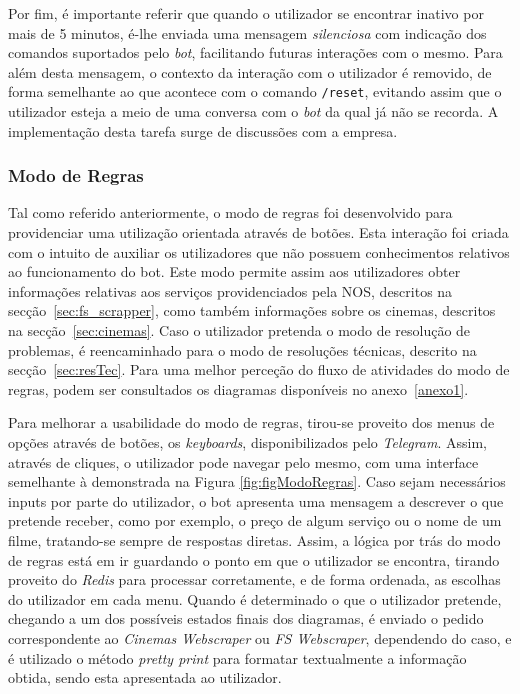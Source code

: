 \documentclass[11pt,a4paper]{article}
\begin{document}
Por fim, é importante referir que quando o utilizador se encontrar inativo por mais de 5 minutos, é-lhe
enviada uma mensagem \textit{silenciosa} com indicação dos comandos suportados pelo \textit{bot},
facilitando futuras interações com o mesmo. Para além desta mensagem, o contexto da interação com o
utilizador é removido, de forma semelhante ao que acontece com o comando \texttt{/reset}, evitando assim que
o utilizador esteja a meio de uma conversa com o \textit{bot} da qual já não se recorda. A implementação
desta tarefa surge de discussões com a empresa.

\subsubsection{Modo de Regras}\label{sec:modoregras}

Tal como referido anteriormente, o modo de regras foi desenvolvido para providenciar uma utilização
orientada através de botões. Esta interação foi criada com o intuito de auxiliar os utilizadores que não
possuem conhecimentos relativos ao funcionamento do bot. Este modo permite assim aos utilizadores obter
informações relativas aos serviços providenciados pela NOS, descritos na secção~\ref{sec:fs_scrapper}, como
também informações sobre os cinemas, descritos na secção~\ref{sec:cinemas}. Caso o utilizador pretenda o
modo de resolução de problemas, é reencaminhado para o modo de resoluções técnicas, descrito na
secção~\ref{sec:resTec}. Para uma melhor perceção do fluxo de atividades do modo de regras, podem ser
consultados os diagramas disponíveis no anexo~\ref{anexo1}.

Para melhorar a usabilidade do modo de regras, tirou-se proveito dos menus de opções através de botões, os
\textit{keyboards}, disponibilizados pelo \textit{Telegram}. Assim, através de cliques, o utilizador pode
navegar pelo mesmo, com uma interface semelhante à demonstrada na Figura \ref{fig:figModoRegras}. Caso sejam
necessários inputs por parte do utilizador, o bot apresenta uma mensagem a descrever o que pretende receber,
como por exemplo, o preço de algum serviço ou o nome de um filme, tratando-se sempre de respostas
diretas. Assim, a lógica por trás do modo de regras está em ir guardando o ponto em que o utilizador se
encontra, tirando proveito do \textit{Redis} para processar corretamente, e de forma ordenada, as escolhas
do utilizador em cada menu. Quando é determinado o que o utilizador pretende, chegando a um dos possíveis
estados finais dos diagramas, é enviado o pedido correspondente ao \textit{Cinemas Webscraper} ou \textit{FS
Webscraper}, dependendo do caso, e é utilizado o método \textit{pretty print} para formatar textualmente a
informação obtida, sendo esta apresentada ao utilizador.
\end{document}

